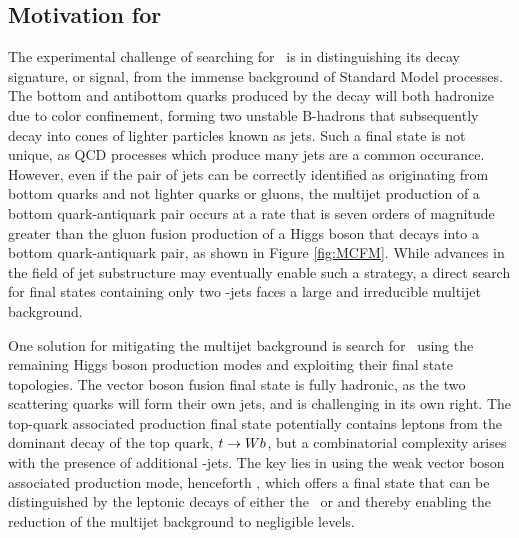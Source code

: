 \subsection{Motivation for \VHbb}

The experimental challenge of searching for \Hbb\ is in distinguishing its decay signature, or signal, from the immense background of Standard Model processes. The bottom and antibottom quarks produced by the decay will both hadronize due to color confinement, forming two unstable B-hadrons that subsequently decay into cones of lighter particles known as jets. Such a final state is not unique, as QCD processes which produce many jets are a common occurance. However, even if the pair of jets can be correctly identified as originating from bottom quarks and not lighter quarks or gluons, the multijet production of a bottom quark-antiquark pair occurs at a rate that is seven orders of magnitude greater than the gluon fusion production of a Higgs boson that decays into a bottom quark-antiquark pair, as shown in Figure \ref{fig:MCFM}. While advances in the field of jet substructure may eventually enable such a strategy\cite{ggHbb}, a direct search for final states containing only two \qrkb-jets faces a large and irreducible multijet background.

One solution for mitigating the multijet background is search for \Hbb\ using the remaining Higgs boson production modes and exploiting their final state topologies. The vector boson fusion final state is fully hadronic, as the two scattering quarks will form their own jets, and is challenging in its own right. The top-quark associated production final state potentially contains leptons from the dominant decay of the top quark, $t \rightarrow Wb$, but a combinatorial complexity arises with the presence of additional \qrkb-jets. The key lies in using the weak vector boson associated production mode, henceforth \VHbb, which offers a final state that can be distinguished by the leptonic decays of either the \bosW\ or \bosZ and thereby enabling the reduction of the multijet background to negligible levels.

